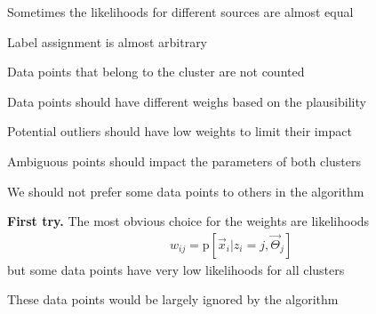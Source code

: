 \documentclass[landscape,footrule]{foils}
\newcommand{\pd}[1]{\mathrm{p}[#1]}
\begin{document}
Sometimes the likelihoods for different sources are almost equal
\begin{triangles}
\item Label assignment is almost arbitrary 
\item Data points that belong to the cluster are not counted
\end{triangles}


Data points should have different weighs based on the plausibility 
\begin{triangles}
\item Potential outliers should have low weights to limit their impact
\item Ambiguous points should impact the parameters of both clusters 
\item We should not prefer some data points to others in the algorithm
\end{triangles} 
\vspace*{2cm}

\textbf{First try.}
The most obvious choice for the weights are likelihoods
\begin{align*}
w_{ij}=\pd{\vec{x}_i|z_i=j,\vec{\Theta}_j}
\end{align*} 
but some data points have very low likelihoods for all clusters
\begin{triangles}
\item These data points would be largely ignored by the algorithm 
\end{triangles} 

\end{document}
